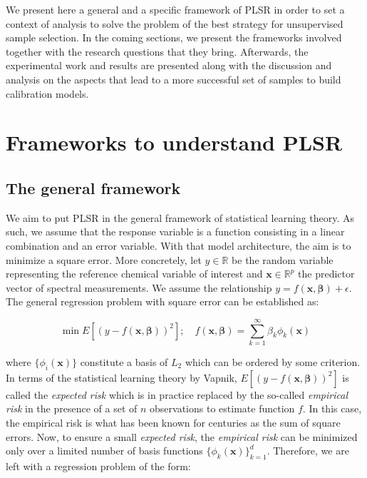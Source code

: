 \documentclass[journal=ancham,manuscript=article]{achemso}
\begin{document}
We present here a general and a specific framework of PLSR in order to set a context of analysis to solve the problem of the best strategy for unsupervised sample selection. In the coming sections, we present the frameworks involved together with the research questions that they bring. Afterwards, the experimental work and results are presented along with the discussion and analysis on the aspects that lead to a more successful set of samples to build calibration models.


\section*{Frameworks to understand PLSR}

\subsection*{The general framework}

We aim to put PLSR in the general framework of statistical learning theory. As such, we assume that the response variable is a function consisting in a linear combination and an error variable. With that model architecture, the aim is to minimize a square error. More concretely, let $y \in \mathbb{R}$ be the random variable representing the reference chemical variable of interest and   $\mathbf{x} \in \mathbb{R}^{p}$ the predictor vector of spectral measurements. We assume the relationship $ y = f(\mathbf{x}, \boldsymbol{\beta}) + \epsilon$.  The general regression problem with square error can be established as:

\begin{equation}
    \min E \left[ (y-f(\mathbf{x}, \boldsymbol{\beta}))^2\right]; \quad f(\mathbf{x}, \boldsymbol{\beta}) = \sum_{k=1}^{\infty} \beta_k \phi_{k}(\mathbf{x})
    \label{eq_general_regression_problem}
\end{equation}

where $\{\phi_{i}(\mathbf{x})\}$ constitute a basis of $L_2$ which can be ordered by some criterion. In terms of the statistical learning theory by Vapnik, $E \left[ (y-f(\mathbf{x}, \boldsymbol{\beta}))^2\right]$ is called the \emph{expected risk} which is in practice replaced by the so-called \emph{empirical risk} in the presence of a set of $n$ observations to estimate function $f$. In this case, the empirical risk is what has been known for centuries as the sum of square errors. Now, to ensure a small \emph{expected risk}, the \emph{empirical risk} can be minimized only over a limited number of basis functions $\{\phi_{k}(\mathbf{x})\}_{k=1}^d$. Therefore, we are left with a regression problem of the form:
\end{document}
